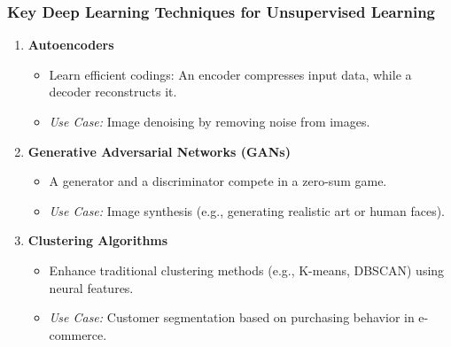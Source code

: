\documentclass[aspectratio=169]{beamer}
\begin{document}
\begin{frame}[fragile]
    \frametitle{Key Deep Learning Techniques for Unsupervised Learning}
    \begin{enumerate}
        \item \textbf{Autoencoders}
            \begin{itemize}
                \item Learn efficient codings: An encoder compresses input data, while a decoder reconstructs it.
                \item \textit{Use Case:} Image denoising by removing noise from images.
            \end{itemize}
            
        \item \textbf{Generative Adversarial Networks (GANs)}
            \begin{itemize}
                \item A generator and a discriminator compete in a zero-sum game.
                \item \textit{Use Case:} Image synthesis (e.g., generating realistic art or human faces).
            \end{itemize}
            
        \item \textbf{Clustering Algorithms}
            \begin{itemize}
                \item Enhance traditional clustering methods (e.g., K-means, DBSCAN) using neural features.
                \item \textit{Use Case:} Customer segmentation based on purchasing behavior in e-commerce.
            \end{itemize}
    \end{enumerate}
\end{frame}
\end{document}
